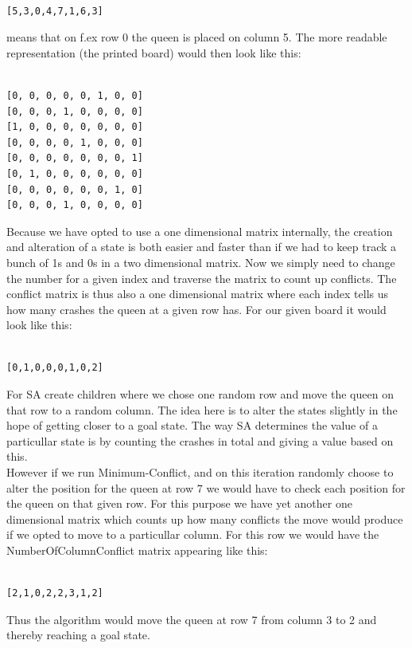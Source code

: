 \documentclass[12pt, a4paper]{article}
\begin{document}
\begin{verbatim}

[5,3,0,4,7,1,6,3]

\end{verbatim}
\noindent
means that on f.ex row 0 the queen is placed on column 5. The more readable representation (the printed board) would then look like this:

\begin{verbatim}

[0, 0, 0, 0, 0, 1, 0, 0]
[0, 0, 0, 1, 0, 0, 0, 0]
[1, 0, 0, 0, 0, 0, 0, 0]
[0, 0, 0, 0, 1, 0, 0, 0]
[0, 0, 0, 0, 0, 0, 0, 1]
[0, 1, 0, 0, 0, 0, 0, 0]
[0, 0, 0, 0, 0, 0, 1, 0]
[0, 0, 0, 1, 0, 0, 0, 0]

\end{verbatim}

\noindent
Because we have opted to use a one dimensional matrix internally, the creation and alteration of a state is both easier and faster than if we had to keep track a bunch of 1s and 0s in a two dimensional matrix. Now we simply need to change the number for a given index and traverse the matrix to count up conflicts. The conflict matrix is thus also a one dimensional matrix where each index tells us how many crashes the queen at a given row has. For our given board it would look like this:

\begin{verbatim}

[0,1,0,0,0,1,0,2]

\end{verbatim}

\noindent
For SA create children where we chose one random row and move the queen on that row to a random column. The idea here is to alter the states slightly in the hope of getting closer to a goal state. The way SA determines the value of a particullar state is by counting the crashes in total and giving a value based on this. 
\\
However if we run Minimum-Conflict, and on this iteration randomly choose to alter the position for the queen at row 7 we would have to check each position for the queen on that given row. For this purpose we have yet another one dimensional matrix which counts up how many conflicts the move would produce if we opted to move to a particullar column. For this row we would have the NumberOfColumnConflict matrix appearing like this:

\begin{verbatim}

[2,1,0,2,2,3,1,2]

\end{verbatim}
\noindent
Thus the algorithm would move the queen at row 7 from column 3 to 2 and thereby reaching a goal state. 
\end{document}
